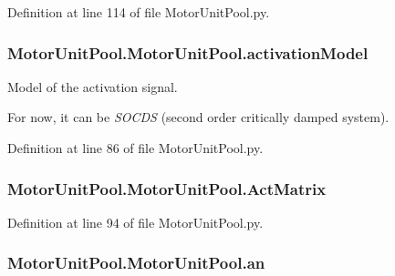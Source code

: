 Definition at line 114 of file Motor\-Unit\-Pool.\-py.

\hypertarget{class_motor_unit_pool_1_1_motor_unit_pool_abaa7680d0691fac81f66b200dfcfd203}{
\subsubsection[{activation\-Model}]{\setlength{\rightskip}{0pt plus 5cm}Motor\-Unit\-Pool.\-Motor\-Unit\-Pool.\-activation\-Model}}\label{class_motor_unit_pool_1_1_motor_unit_pool_abaa7680d0691fac81f66b200dfcfd203}


Model of the activation signal. 

For now, it can be {\itshape S\-O\-C\-D\-S} (second order critically damped system). 

Definition at line 86 of file Motor\-Unit\-Pool.\-py.

\hypertarget{class_motor_unit_pool_1_1_motor_unit_pool_ad03b9e215e833188060e90bc4392d42b}{
\subsubsection[{Act\-Matrix}]{\setlength{\rightskip}{0pt plus 5cm}Motor\-Unit\-Pool.\-Motor\-Unit\-Pool.\-Act\-Matrix}}\label{class_motor_unit_pool_1_1_motor_unit_pool_ad03b9e215e833188060e90bc4392d42b}


Definition at line 94 of file Motor\-Unit\-Pool.\-py.

\hypertarget{class_motor_unit_pool_1_1_motor_unit_pool_ac72c67b4a1f6134965ab77e2d798b5a4}{
\subsubsection[{an}]{\setlength{\rightskip}{0pt plus 5cm}Motor\-Unit\-Pool.\-Motor\-Unit\-Pool.\-an}}\label{class_motor_unit_pool_1_1_motor_unit_pool_ac72c67b4a1f6134965ab77e2d798b5a4}



